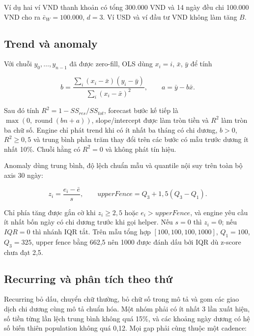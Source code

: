 Ví dụ hai ví VND thanh khoản có tổng 300.000 VND và 14 ngày đều chi 100.000 VND cho ra $\bar e_W=100.000$, $d=3$. Ví USD và ví đầu tư VND không làm tăng $B$.

\subsection{Trend và anomaly}

Với chuỗi $y_0,\ldots,y_{n-1}$ đã được zero-fill, OLS dùng $x_i=i$, $\bar x$, $\bar y$ để tính

\begin{equation}
  b=\frac{\sum_i(x_i-\bar x)(y_i-\bar y)}{\sum_i(x_i-\bar x)^2},
  \qquad a=\bar y-b\bar x.
\end{equation}

Sau đó tính $R^2=1-SS_{res}/SS_{tot}$, forecast bước kế tiếp là $\max(0,\operatorname{round}(bn+a))$, slope/intercept được làm tròn tiền và $R^2$ làm tròn ba chữ số. Engine chỉ phát trend khi có ít nhất ba tháng có chi dương, $b>0$, $R^2\geq0{,}5$ và trung bình phần trăm thay đổi trên các bước có mẫu trước dương ít nhất 10\%. Chuỗi hằng có $R^2=0$ và không phát tín hiệu.

Anomaly dùng trung bình, độ lệch chuẩn mẫu và quantile nội suy trên toàn bộ axis 30 ngày:

\begin{equation}
  z_i=\frac{e_i-\bar e}{s},
  \qquad upperFence=Q_3+1{,}5(Q_3-Q_1).
\end{equation}

Chỉ phía tăng được gắn cờ khi $z_i\geq2{,}5$ hoặc $e_i>upperFence$, và engine yêu cầu ít nhất bốn ngày có chi dương trước khi gọi helper. Nếu $s=0$ thì $z_i=0$; nếu $IQR=0$ thì nhánh IQR tắt. Trên mẫu tổng hợp $[100,100,100,1000]$, $Q_1=100$, $Q_3=325$, upper fence bằng 662,5 nên 1000 được đánh dấu bởi IQR dù z-score chưa đạt 2,5.

\subsection{Recurring và phân tích theo thứ}

Recurring bỏ dấu, chuyển chữ thường, bỏ chữ số trong mô tả và gom các giao dịch chi dương cùng mô tả chuẩn hóa. Một nhóm phải có ít nhất 3 lần xuất hiện, số tiền từng lần lệch trung bình không quá 15\%, và các khoảng ngày dương có hệ số biến thiên population không quá 0,12. Mọi gap phải cùng thuộc một cadence:


